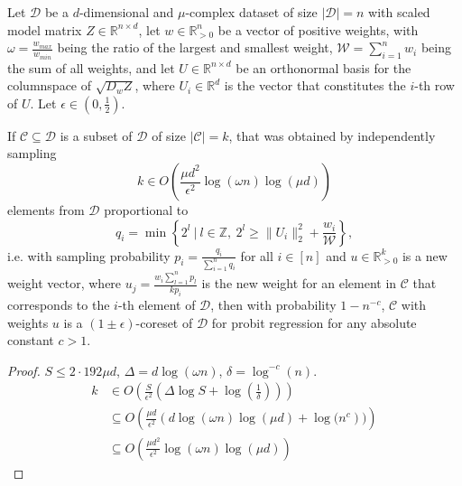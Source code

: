 \begin{theorem}
    Let $\mathcal{D}$ be a $d$-dimensional and $\mu$-complex dataset of
    size $|\mathcal{D}|=n$ with scaled model matrix
    $Z \in \mathbb{R}^{n \times d}$, let $w \in \mathbb{R}^n_{>0}$ be
    a vector of positive weights, with
    $\omega = \frac{w_{max}}{w_{min}}$ being the ratio of the largest and
    smallest weight, $\mathcal{W} = \sum_{i=1}^n w_i$ being the
    sum of all weights, and let $U \in \mathbb{R}^{n \times d}$
    be an orthonormal basis for the columnspace of
    $\sqrt{D_wZ}$, where $U_i \in \mathbb{R}^d$ is the vector that
    constitutes the $i$-th row of $U$. Let
    $\epsilon \in (0, \frac{1}{2})$.

    If $\mathcal{C} \subseteq \mathcal{D}$ is a subset of $\mathcal{D}$
    of size $|\mathcal{C}| = k$, that was obtained by independently sampling
    \begin{equation*}
        k \in O\left(\frac{\mu d^2}{\epsilon^2} \log(\omega n) \log(\mu d)\right)
    \end{equation*}
    elements from $\mathcal{D}$ proportional to
    \begin{equation*}
        q_i = \min\left\{ 2^l\ |\ l \in \mathbb{Z},\  2^l \geq \lVert U_i \rVert_2^2 + \frac{w_i}{\mathcal{W}} \right\},
    \end{equation*}
    i.e. with sampling probability $p_i = \frac{q_i}{\sum_{i=1}^n q_i}$
    for all $i \in [n]$ and
    $u \in \mathbb{R}^k_{>0}$ is a new weight vector, where
    $u_j = \frac{w_i \sum_{l=1}^n p_l}{kp_i}$ is the new weight for
    an element in $\mathcal{C}$ that corresponds to the $i$-th element
    of $\mathcal{D}$,
    then with probability $1 - n^{-c}$, $\mathcal{C}$ with weights $u$
    is a $(1 \pm \epsilon)$-coreset of $\mathcal{D}$ for probit regression
    for any absolute constant $c > 1$.
\end{theorem}
\begin{proof}
    $S \leq 2 \cdot 192 \mu d$, $\Delta = d\log(\omega n)$, $\delta = \log^{-c}(n)$.
    \begin{align*}
        k & \in O\left( \frac{S}{\epsilon^2} \left(\Delta \log S + \log\left(\frac{1}{\delta}\right)\right)\right) \\
          & \subseteq O\left(\frac{\mu d}{\epsilon^2}\left(d \log(\omega n) \log(\mu d) + \log(n^c\right))\right)  \\
          & \subseteq O\left(\frac{\mu d^2}{\epsilon^2}\log(\omega n) \log(\mu d)\right)
    \end{align*}
\end{proof}
